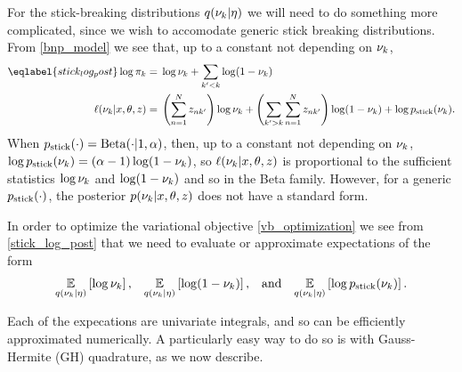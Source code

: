 For the stick-breaking distributions $q(\nu_k \vert \eta)$ we will need to do
something more complicated, since we wish to accomodate generic stick breaking
distributions.  From \eqref{bnp_model} we see that, up to a constant not
depending on $\nu_k$,
%
\begin{align}\eqlabel{stick_log_post}
%
\log \pi_\k ={}&
    \log \nu_\k + \sum_{\k' < \k} \log (1 - \nu_\k) \nonumber \\
\logp(\nu_{\k} \vert \x, \theta, \z) ={}&
    \left(\sum_{\n=1}^\N \z_{\n\k'}\right) \log \nu_\k +
    \left( \sum_{\k' > \k} \sum_{\n=1}^\N \z_{\n\k'} \right) \log (1 - \nu_\k) +
    \log \pstick(\nu_\k).
%
\end{align}
%
When $p_{\mathrm{stick}}(\cdot) = \mathrm{Beta}(\cdot | 1, \alpha)$, then, up to a constant
not depending on $\nu_k$, $\log p_{\mathrm{stick}}(\nu_k) = (\alpha - 1) \log (1 -
\nu_k)$, so $\ell(\nu_{k} \vert x, \theta, z)$ is proportional to the
sufficient statistics $\log \nu_k$ and $\log(1 - \nu_k)$ and so in the
Beta family.  However, for a generic $p_{\mathrm{stick}}(\cdot)$, the posterior
$p(\nu_{k} \vert x, \theta, z)$ does not have a standard form.

In order to optimize the variational objective \eqref{vb_optimization} we see
from \eqref{stick_log_post} that we need to evaluate or approximate expectations
of the form
%
\begin{align*}
%
\expect{\q(\nu_\k \vert \eta)}{\log \nu_\k}
\textrm{,}\quad
\expect{\q(\nu_\k \vert \eta)}{\log (1 - \nu_\k)}
\textrm{,}\quad\textrm{and}\quad
\expect{\q(\nu_\k \vert \eta)}{\log \pstick(\nu_\k)}.
%
\end{align*}

Each of the expecations are univariate integrals, and so can be efficiently
approximated numerically.  A particularly easy way to do so is with
Gauss-Hermite (GH) quadrature, as we now describe.

